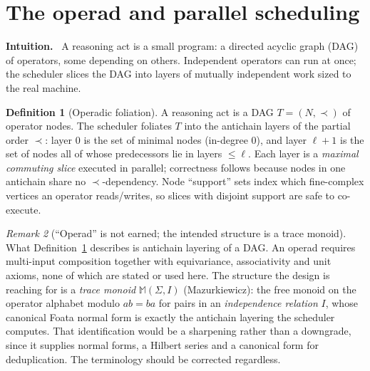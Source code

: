 \documentclass[11pt]{article}
\theoremstyle{definition}
\newtheorem{definition}{Definition}[section]
\theoremstyle{plain}
\theoremstyle{remark}
\newtheorem{remark}[definition]{Remark}
\newcommand{\Intu}{\noindent\textbf{\color{intuitioncol}Intuition.}\ }
\begin{document}
\section{The operad and parallel scheduling}\label{sec:operad}

\begin{intu}\Intu
A reasoning act is a small program: a directed acyclic graph (DAG) of operators, some
depending on others. Independent operators can run at once; the scheduler slices the
DAG into layers of mutually independent work sized to the real machine.
\end{intu}

\begin{definition}[Operadic foliation]\label{def:foliation-note}
A reasoning act is a DAG $T=(N,\prec)$ of operator nodes. The scheduler foliates $T$
into the antichain layers of the partial order $\prec$: layer $0$ is the set of
minimal nodes (in-degree $0$), and layer $\ell+1$ is the set of nodes all of whose
predecessors lie in layers $\le\ell$. Each layer is a \emph{maximal commuting slice}
executed in parallel; correctness follows because nodes in one antichain share no
$\prec$-dependency. Node ``support'' sets index which fine-complex vertices an operator
reads/writes, so slices with disjoint support are safe to co-execute.
\end{definition}

\begin{remark}[``Operad'' is not earned; the intended structure is a trace monoid]\label{rem:tracemonoid}
What Definition~\ref{def:foliation-note} describes is antichain layering of a DAG. An
operad requires multi-input composition together with equivariance, associativity and
unit axioms, none of which are stated or used here. The structure the design is
reaching for is a \emph{trace monoid} $\mathbb M(\Sigma,I)$ (Mazurkiewicz): the free
monoid on the operator alphabet modulo $ab=ba$ for pairs in an \emph{independence
relation} $I$, whose canonical Foata normal form is exactly the antichain layering the
scheduler computes. That identification would be a sharpening rather than a downgrade,
since it supplies normal forms, a Hilbert series and a canonical form for
deduplication. The terminology should be corrected regardless.
\end{remark}
\end{document}
